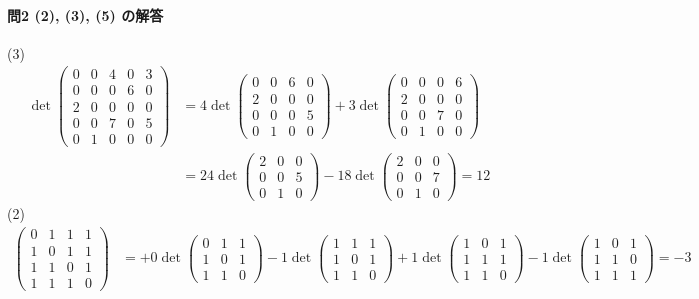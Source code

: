 \paragraph{問2 (2), (3), (5) の解答} %
(3)
\begin{align*}
\det
\begin{pmatrix}
0 & 0 & 4 & 0 & 3 \\
0 & 0 & 0 & 6 & 0 \\
2 & 0 & 0 & 0 & 0 \\
0 & 0 & 7 & 0 & 5 \\
0 & 1 & 0 & 0 & 0
\end{pmatrix}
&= 4 \det
\begin{pmatrix}
0 & 0 & 6 & 0 \\
2 & 0 & 0 & 0 \\
0 & 0 & 0 & 5 \\
0 & 1 & 0 & 0
\end{pmatrix}
+ 3 \det
\begin{pmatrix}
0 & 0 & 0 & 6 \\
2 & 0 & 0 & 0 \\
0 & 0 & 7 & 0 \\
0 & 1 & 0 & 0
\end{pmatrix} \\
&= 24 \det
\begin{pmatrix}
2 & 0 & 0 \\
0 & 0 & 5 \\
0 & 1 & 0
\end{pmatrix}
- 18 \det
\begin{pmatrix}
2 & 0 & 0 \\
0 & 0 & 7 \\
0 & 1 & 0
\end{pmatrix}
= 12
\end{align*}
(2)
\begin{align*}
\begin{pmatrix}
0 & 1 & 1 & 1 \\
1 & 0 & 1 & 1 \\
1 & 1 & 0 & 1 \\
1 & 1 & 1 & 0
\end{pmatrix}
&= +0 \det
\begin{pmatrix}
0 & 1 & 1 \\
1 & 0 & 1 \\
1 & 1 & 0
\end{pmatrix}
- 1 \det
\begin{pmatrix}
1 & 1 & 1 \\
1 & 0 & 1 \\
1 & 1 & 0
\end{pmatrix}
+ 1 \det
\begin{pmatrix}
1 & 0 & 1 \\
1 & 1 & 1 \\
1 & 1 & 0
\end{pmatrix}
- 1 \det
\begin{pmatrix}
1 & 0 & 1 \\
1 & 1 & 0 \\
1 & 1 & 1 
\end{pmatrix} = -3
\end{align*}
